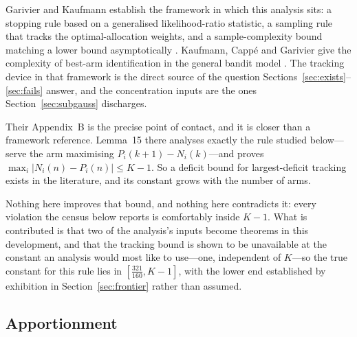 Garivier and Kaufmann establish the framework in which this analysis sits: a stopping rule
based on a generalised likelihood-ratio statistic, a sampling rule that tracks the
optimal-allocation weights, and a sample-complexity bound matching a lower bound
asymptotically \cite{garivier2016}. Kaufmann, Capp\'e and Garivier give the complexity of
best-arm identification in the general bandit model \cite{kaufmann2016}. The tracking device
in that framework is the direct source of the question
Sections~\ref{sec:exists}--\ref{sec:fails} answer, and the concentration inputs are the ones
Section~\ref{sec:subgauss} discharges.

Their Appendix~B is the precise point of contact, and it is closer than a framework
reference. Lemma~15 there analyses exactly the rule studied below---serve the arm maximising
$P_{i}(k{+}1)-N_{i}(k)$---and proves $\max_{i}|N_{i}(n)-P_{i}(n)|\le K-1$. So a deficit bound
for largest-deficit tracking exists in the literature, and its constant grows with the number
of arms.

Nothing here improves that bound, and nothing here contradicts it: every violation the census
below reports is comfortably inside $K-1$. What is contributed is that two of the analysis's
inputs become theorems in this development, and that the tracking bound is shown to be
unavailable at the constant an analysis would most like to use---one, independent of $K$---so
the true constant for this rule lies in $[\tfrac{321}{160},K-1]$, with the lower end
established by exhibition in Section~\ref{sec:frontier} rather than assumed.

\subsection{Apportionment}

